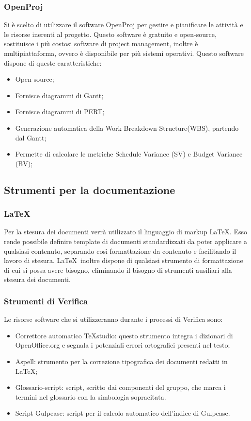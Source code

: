 \subsubsection{OpenProj}
Si è scelto di utilizzare il software OpenProj per gestire e pianificare le attività e le risorse inerenti al progetto.
Questo software è gratuito e open-source, sostituisce i più costosi software di project management, inoltre è multipiattaforma, ovvero è disponibile per più sistemi operativi.
Questo software dispone di queste caratteristiche:
\begin{itemize}
\item Open-source;
\item Fornisce diagrammi di Gantt;
\item Fornisce diagrammi di PERT;
\item Generazione automatica della Work Breakdown Structure(WBS), partendo dal Gantt;
\item Permette di calcolare le metriche Schedule Variance (SV) e Budget Variance (BV);
\end{itemize}
\label{}


\subsection{Strumenti per la documentazione}
\label{}
\subsubsection{LaTeX}
\label{5.7}
Per la stesura dei documenti verrà utilizzato il linguaggio di markup \LaTeX. Esso rende possibile definire template di documenti standardizzati da poter applicare a qualsiasi contenuto, separando così formattazione da contenuto e facilitando il lavoro di stesura. \LaTeX\ inoltre dispone di qualsiasi strumento di formattazione di cui si possa avere bisogno, eliminando il bisogno di strumenti ausiliari alla stesura dei documenti.

\subsubsection{Strumenti di Verifica}
\label{}
Le risorse software che si utilizzeranno durante i processi di Verifica sono:
\begin{itemize}
\item Correttore automatico TeXstudio: questo strumento integra i dizionari di OpenOffice.org e segnala i potenziali errori ortografici presenti nel testo;
\item Aspell: strumento per la correzione tipografica dei documenti redatti in \LaTeX ;
\item Glossario-script: script, scritto dai componenti del gruppo, che marca i termini nel glossario con la simbologia sopracitata.
\item Script Gulpease: script per il calcolo automatico dell'indice di Gulpease.
\end{itemize}

